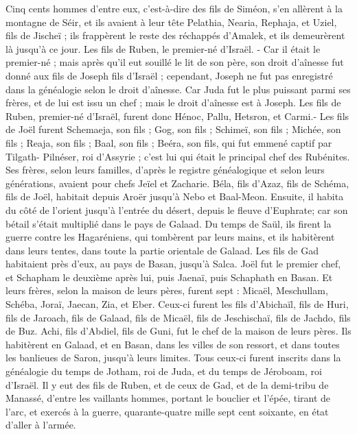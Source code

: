 \begin{multicols}{2}
Cinq cents hommes d'entre eux, c'est-à-dire des fils de Siméon, s'en allèrent à la montagne de Séir, et ils avaient à leur tête Pelathia, Nearia, Rephaja, et Uziel, fils de Jischeï ;
ils frappèrent le reste des réchappés d'Amalek, et ils demeurèrent là jusqu'à ce jour.
\VerseOne{}Les fils de Ruben, le premier-né d'Israël. - Car il était le premier-né ; mais après qu'il eut souillé le lit de son père, son droit d'aînesse fut donné aux fils de Joseph fils d'Israël ; cependant, Joseph ne fut pas enregistré  dans la généalogie selon le droit d'aînesse.
Car Juda fut le plus puissant parmi ses frères, et de lui est issu un chef ; mais le droit d'aînesse est à Joseph.
Les fils de Ruben, premier-né d'Israël, furent donc Hénoc, Pallu, Hetsron, et Carmi.-
Les fils de Joël furent  Schemaeja, son fils ; Gog, son fils ; Schimeï, son fils ;
Michée, son fils ; Reaja, son fils ; Baal,  son fils ;
Beéra, son fils, qui fut emmené captif par Tilgath- Pilnéser, roi d’Assyrie ; c'est lui qui était le principal chef des Rubénites.
Ses frères, selon leurs familles, d’après le registre généalogique et selon leurs générations, avaient pour chefs Jeïel et Zacharie.
Béla, fils d’Azaz, fils de Schéma, fils de Joël, habitait depuis Aroër jusqu'à Nebo et Baal-Meon.
Ensuite, il habita du côté de l’orient jusqu'à l'entrée du désert, depuis le fleuve d'Euphrate; car son bétail s'était multiplié dans le pays de Galaad.
Du temps de Saül, ils firent la guerre contre les Hagaréniens, qui tombèrent par leurs mains, et ils habitèrent dans leurs tentes, dans toute la partie orientale de Galaad.
Les fils de Gad habitaient près d'eux, au pays de Basan, jusqu'à Salca.
Joël fut le premier chef, et Schapham le deuxième après lui, puis Jaenaï, puis Schaphath en Basan.
Et leurs frères, selon la maison de leurs pères, furent sept : Micaël, Meschullam, Schéba, Joraï, Jaecan, Zia, et Eber.
Ceux-ci furent les fils d'Abichaïl, fils de Huri, fils de Jaroach, fils de Galaad, fils de Micaël, fils de Jeschischaï, fils de Jachdo, fils de Buz.
Achi, fils d'Abdiel, fils de Guni, fut le chef de la maison de leurs pères.
Ils habitèrent en Galaad, et en Basan, dans les villes de son ressort, et dans toutes les banlieues de Saron, jusqu’à leurs limites.
Tous ceux-ci furent inscrits dans la généalogie du temps de Jotham, roi de Juda, et du temps de Jéroboam, roi d'Israël.
Il y eut des fils de Ruben, et de ceux de Gad, et de la demi-tribu de Manassé, d'entre les vaillants hommes, portant le bouclier et l'épée, tirant de l'arc, et exercés à la guerre, quarante-quatre mille sept cent soixante, en état d’aller à l’armée.

\end{multicols}
